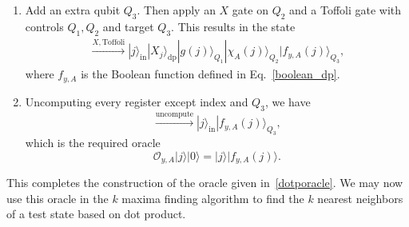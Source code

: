 \documentclass[a4paper,twocolumn,11pt,unpublished]{quantumarticle}
\newcommand{\rang}{\rangle}
\begin{document}
\begin{enumerate}
        \item 
            Add an extra qubit $Q_3$. Then apply an $X$ gate on $Q_2$ and a Toffoli gate with controls $Q_1, Q_2$ and target $Q_3$. This results in the state
            \begin{equation}
                \begin{split}
                    \xrightarrow{X, \text{Toffoli}}|j\rang_\text{in} |X_j\rang_\text{dp} |g(j)\rang_{Q_1} |\chi_A(j)\rang_{Q_2} |f_{y,A}(j)\rang_{Q_3},
                \end{split}
            \end{equation}
            where $f_{y,A}$ is the Boolean function defined in Eq.~\eqref{boolean_dp}.
        \item
            Uncomputing every register except index and $Q_3$, we have
            \begin{equation}
                \xrightarrow {\text{uncompute}}|j\rang_{\text{in}}|f_{y, A}(j)\rang_{Q_3},
            \end{equation}
            which is the required oracle
            \begin{equation}
                \mathcal O_{y, A}|j\rang|0\rang = |j\rang|f_{y,A}(j)\rang.
            \end{equation}
    \end{enumerate}
    This completes the construction of the oracle given in~\eqref{dotporacle}. We may now use this oracle in the $k$ maxima finding algorithm to find the $k$ nearest neighbors of a test state based on dot product. 
    
\end{document}
